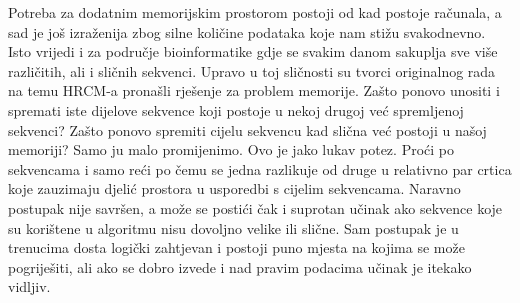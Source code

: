 Potreba za dodatnim memorijskim prostorom postoji od kad postoje računala, a sad je još izraženija zbog silne količine podataka koje nam stižu svakodnevno. Isto vrijedi i za područje bioinformatike gdje se svakim danom sakuplja sve više različitih, ali i sličnih sekvenci. Upravo u toj sličnosti su tvorci originalnog rada na temu HRCM-a pronašli rješenje za problem memorije. Zašto ponovo unositi i spremati iste dijelove sekvence koji postoje u nekoj drugoj već spremljenoj sekvenci? Zašto ponovo spremiti cijelu sekvencu kad slična već postoji u našoj memoriji? Samo ju malo promijenimo. Ovo je jako lukav potez. Proći po sekvencama i samo reći po čemu se jedna razlikuje od druge u relativno par crtica koje zauzimaju djelić prostora u usporedbi s cijelim sekvencama. Naravno postupak nije savršen, a može se postići čak i suprotan učinak ako sekvence koje su korištene u algoritmu nisu dovoljno velike ili slične. Sam postupak je u trenucima dosta logički zahtjevan i postoji puno mjesta na kojima se može pogriješiti, ali ako se dobro izvede i nad pravim podacima učinak je itekako vidljiv. 